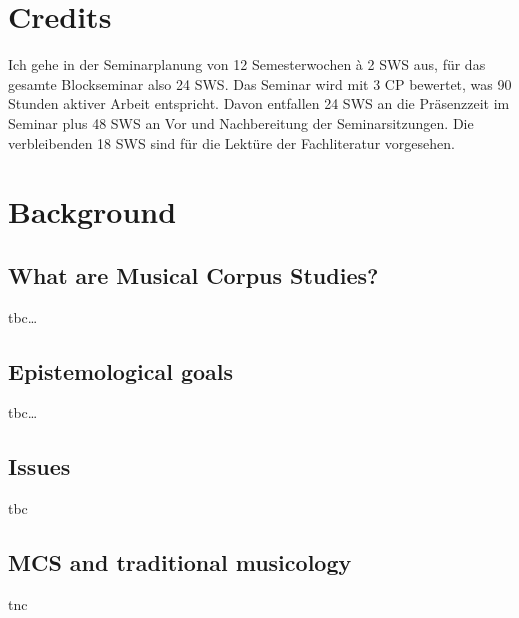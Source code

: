 \documentclass[letterpaper,10pt,english]{sphinxmanual}
\begin{document}
\chapter{Credits}
\label{\detokenize{orga:credits}}
Ich gehe in der Seminarplanung von 12 Semesterwochen à 2 SWS aus, für das gesamte Blockseminar also 24 SWS.
Das Seminar wird mit 3 CP bewertet, was 90 Stunden aktiver Arbeit entspricht.
Davon entfallen 24 SWS an die Präsenzzeit im Seminar plus 48 SWS an Vor\sphinxhyphen{} und Nachbereitung der Seminarsitzungen.
Die verbleibenden 18 SWS sind für die Lektüre der Fachliteratur vorgesehen.


\chapter{Background}
\label{\detokenize{background:background}}\label{\detokenize{background::doc}}

\section{What are Musical Corpus Studies?}
\label{\detokenize{background:what-are-musical-corpus-studies}}
tbc…


\section{Epistemological goals}
\label{\detokenize{background:epistemological-goals}}
tbc…


\section{Issues}
\label{\detokenize{background:issues}}
tbc


\section{MCS and traditional musicology}
\label{\detokenize{background:mcs-and-traditional-musicology}}
tnc
\end{document}
